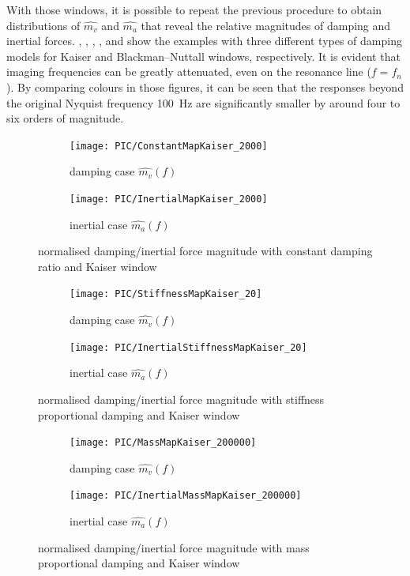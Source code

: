 With those windows, it is possible to repeat the previous procedure to obtain distributions of $\hat{m_v}$ and $\hat{m_a}$ that reveal the relative magnitudes of damping and inertial forces. , , , ,  and  show the examples with three different types of damping models for Kaiser and Blackman--Nuttall windows, respectively. It is evident that imaging frequencies can be greatly attenuated, even on the resonance line ($f=f_n$). By comparing colours in those figures, it can be seen that the responses beyond the original Nyquist frequency \SI{100}{\hertz} are significantly smaller by around four to six orders of magnitude.
\begin{figure}[htb!]
\centering
\begin{subfigure}{.48\textwidth}
\texttt{[image: PIC/ConstantMapKaiser\_2000]}
\caption{damping case $\hat{m_v}\left(f\right)$}
\end{subfigure}
\begin{subfigure}{.48\textwidth}
\texttt{[image: PIC/InertialMapKaiser\_2000]}
\caption{inertial case $\hat{m_a}\left(f\right)$}
\end{subfigure}
\caption{normalised damping/inertial force magnitude with constant damping ratio and Kaiser window}\label{fig:map_constant_kaiser}
\end{figure}
\begin{figure}[htb!]
\centering
\begin{subfigure}{.48\textwidth}
\texttt{[image: PIC/StiffnessMapKaiser\_20]}
\caption{damping case $\hat{m_v}\left(f\right)$}
\end{subfigure}
\begin{subfigure}{.48\textwidth}
\texttt{[image: PIC/InertialStiffnessMapKaiser\_20]}
\caption{inertial case $\hat{m_a}\left(f\right)$}
\end{subfigure}
\caption{normalised damping/inertial force magnitude with stiffness proportional damping and Kaiser window}\label{fig:map_stiffness_kaiser}
\end{figure}
\begin{figure}[htb!]
\centering
\begin{subfigure}{.48\textwidth}
\texttt{[image: PIC/MassMapKaiser\_200000]}
\caption{damping case $\hat{m_v}\left(f\right)$}
\end{subfigure}
\begin{subfigure}{.48\textwidth}
\texttt{[image: PIC/InertialMassMapKaiser\_200000]}
\caption{inertial case $\hat{m_a}\left(f\right)$}
\end{subfigure}
\caption{normalised damping/inertial force magnitude with mass proportional damping and Kaiser window}\label{fig:map_mass_kaiser}
\end{figure}
